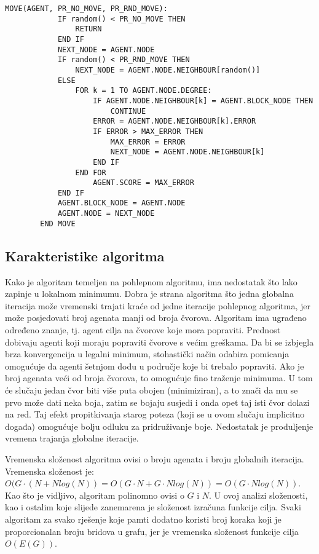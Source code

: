 \documentclass[times, utf8, diplomski, numeric]{fer}
\begin{document}
\begin{singlespace}
	\begin{lstlisting}[caption=Detalji funkcije pomaka - MOVE]
		MOVE(AGENT, PR_NO_MOVE, PR_RND_MOVE):
			IF random() < PR_NO_MOVE THEN
				RETURN
			END IF
			NEXT_NODE = AGENT.NODE
			IF random() < PR_RND_MOVE THEN
				NEXT_NODE = AGENT.NODE.NEIGHBOUR[random()]
			ELSE
				FOR k = 1 TO AGENT.NODE.DEGREE:
					IF AGENT.NODE.NEIGHBOUR[k] = AGENT.BLOCK_NODE THEN
						CONTINUE
					ERROR = AGENT.NODE.NEIGHBOUR[k].ERROR
					IF ERROR > MAX_ERROR THEN
						MAX_ERROR = ERROR
						NEXT_NODE = AGENT.NODE.NEIGHBOUR[k]
					END IF
				END FOR
					AGENT.SCORE = MAX_ERROR
			END IF
			AGENT.BLOCK_NODE = AGENT.NODE
			AGENT.NODE = NEXT_NODE
		END MOVE
	\end{lstlisting}
\end{singlespace}

\subsection{Karakteristike algoritma}

Kako je algoritam temeljen na pohlepnom algoritmu, ima nedostatak što lako zapinje u lokalnom minimumu. Dobra je strana algoritma što jedna globalna iteracija može vremenski trajati kraće od jedne iteracije pohlepnog algoritma, jer može posjedovati broj agenata manji od broja čvorova. Algoritam ima ugrađeno određeno znanje, tj. agent cilja na čvorove koje mora popraviti. Prednost dobivaju agenti koji moraju popraviti čvorove s većim greškama. Da bi se izbjegla brza konvergencija u legalni minimum, stohastički način odabira pomicanja omogućuje da agenti šetnjom dođu u područje koje bi trebalo popraviti. Ako je broj agenata veći od broja čvorova, to omogućuje fino traženje minimuma. U tom će slučaju jedan čvor biti više puta obojen (minimiziran), a to znači da mu se prvo može dati neka boja, zatim se bojaju susjedi i onda opet taj isti čvor dolazi na red. Taj efekt propitkivanja starog poteza (koji se u ovom slučaju implicitno događa) omogućuje bolju odluku za pridruživanje boje. Nedostatak je produljenje vremena trajanja globalne iteracije.

Vremenska složenost algoritma ovisi o broju agenata i broju globalnih iteracija. Vremenska složenost je: $O(G\cdot(N+Nlog(N))=O(G\cdot N+G\cdot Nlog(N))=O(G\cdot Nlog(N))$. Kao što je vidljivo, algoritam polinomno ovisi o $G$ i $N$. U ovoj analizi složenosti, kao i ostalim koje slijede zanemarena je složenost izračuna funkcije cilja. Svaki algoritam za svako rješenje koje pamti dodatno koristi broj koraka koji je proporcionalan broju bridova u grafu, jer je vremenska složenost funkcije cilja $O(E(G))$. 
\end{document}
